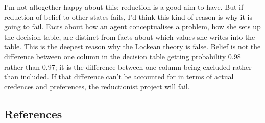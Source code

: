 \documentclass[
  11pt,
  letterpaper,
  DIV=11,
  numbers=noendperiod,
  twoside]{scrartcl}
\begin{document}
I'm not altogether happy about this; reduction is a good aim to have.
But if reduction of belief to other states fails, I'd think this kind of
reason is why it is going to fail. Facts about how an agent
conceptualises a problem, how she sets up the decision table, are
distinct from facts about which values she writes into the table. This
is the deepest reason why the Lockean theory is false. Belief is not the
difference between one column in the decision table getting probability
0.98 rather than 0.97; it is the difference between one column being
excluded rather than included. If that difference can't be accounted for
in terms of actual credences and preferences, the reductionist project
will fail.

\subsection*{References}\label{references}
\end{document}
